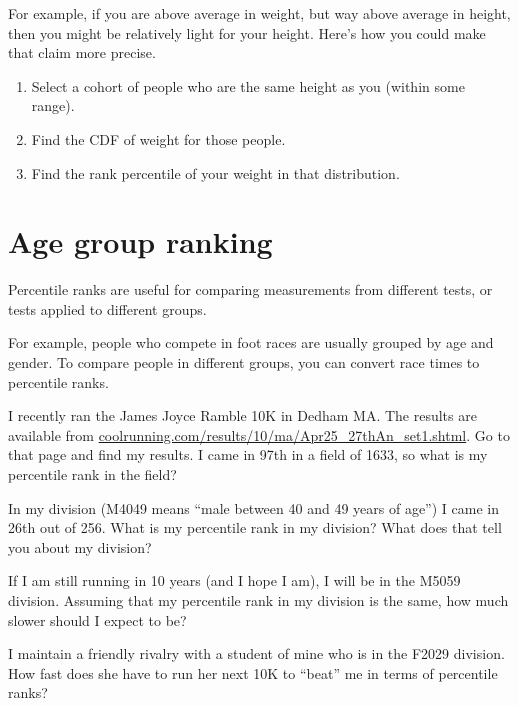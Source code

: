 \documentclass[12pt]{book}
\begin{document}
For example, if you are above average in weight, but way above average
in height, then you might be relatively light for your height.  Here's
how you could make that claim more precise.

\begin{enumerate}

\item Select a cohort of people who are the same height as you (within
some range).

\item Find the CDF of weight for those people.

\item Find the rank percentile of your weight in that distribution.

\end{enumerate}


\section{Age group ranking}

Percentile ranks are useful for comparing measurements from different
tests, or tests applied to different groups.

For example, people who compete in foot races are usually grouped by
age and gender.  To compare people in different groups, you can convert
race times to percentile ranks.

\begin{ex}

I recently ran the James Joyce Ramble 10K
in Dedham MA.  The results are available from
\url{coolrunning.com/results/10/ma/Apr25_27thAn_set1.shtml}.
Go to that page and find my results.  I came in 97th in a field
of 1633, so what is my percentile rank in the field?

In my division (M4049 means ``male between 40 and 49 years of age'')
I came in 26th out of 256.  What is my percentile rank in my division?
What does that tell you about my division?

If I am still running in 10 years (and I hope I am), I will be in
the M5059 division.  Assuming that my percentile rank in my division
is the same, how much slower should I expect to be?

I maintain a friendly rivalry with a student of mine who is in the
F2029 division.  How fast does she have to run her next 10K to
``beat'' me in terms of percentile ranks?

\end{ex}
\end{document}
